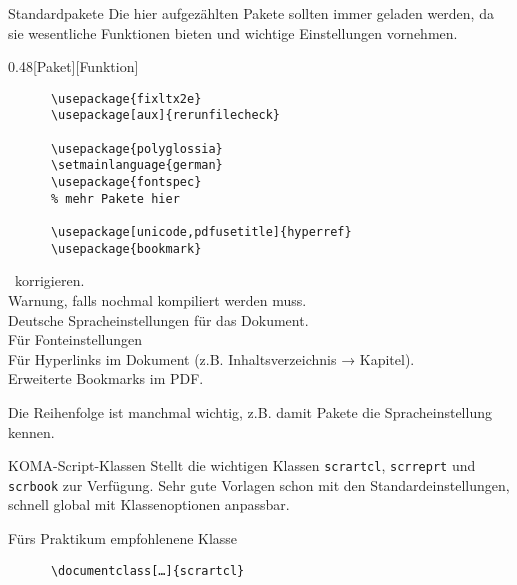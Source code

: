 \begin{frame}[fragile]{Standardpakete}
  Die hier aufgezählten Pakete sollten immer geladen werden, da sie wesentliche Funktionen bieten und wichtige Einstellungen vornehmen.
  \begin{CodeExample}{0.48}[Paket][Funktion]
    \begin{lstlisting}
      \usepackage{fixltx2e}
      \usepackage[aux]{rerunfilecheck}

      \usepackage{polyglossia}
      \setmainlanguage{german}
      \usepackage{fontspec}
      % mehr Pakete hier

      \usepackage[unicode,pdfusetitle]{hyperref}
      \usepackage{bookmark}
    \end{lstlisting}
  \CodeResult
    \LaTeXe\ korrigieren. \\
    Warnung, falls nochmal kompiliert werden muss. \\
    Deutsche Spracheinstellungen für das Dokument. \\
    Für Fonteinstellungen \\[2\baselineskip]
    Für Hyperlinks im Dokument (z.B. Inhaltsverzeichnis → Kapitel). \\
    Erweiterte Bookmarks im PDF.
  \end{CodeExample}

  \vspace{5pt}
  Die Reihenfolge ist manchmal wichtig, z.B. damit Pakete die Spracheinstellung kennen.
\end{frame}

\begin{frame}[fragile]{
  KOMA-Script-Klassen
  \hfill{}
}
  Stellt die wichtigen Klassen \texttt{scrartcl}, \texttt{scrreprt} und \texttt{scrbook} zur Verfügung.
  Sehr gute Vorlagen schon mit den Standardeinstellungen, schnell global mit Klassenoptionen anpassbar.
  \begin{block}{Fürs Praktikum empfohlenene Klasse}
    \begin{lstlisting}
      \documentclass[…]{scrartcl}
    \end{lstlisting}
  \end{block}
\end{frame}

